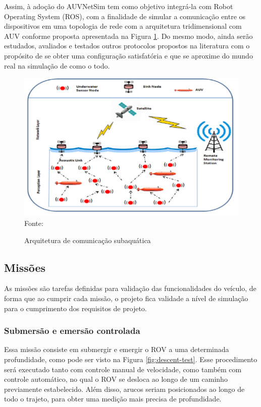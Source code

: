 Assim, à adoção do AUVNetSim tem como objetivo integrá-la com Robot Operating System (ROS), com a finalidade de simular a comunicação entre os dispositivos em uma topologia de rede com a arquitetura tridimensional com AUV conforme proposta apresentada na Figura \ref{fig:redes}. Do mesmo modo, ainda serão estudados, avaliados e testados outros protocolos propostos na literatura com o propósito de se obter uma configuração satisfatória e que se aproxime do mundo real na simulação de como o todo.

\begin{figure}
	\centering
	\caption{Arquitetura de comunicação subaquática}
	\label{fig:redes}
	\includegraphics[width=0.7\linewidth]{images/redes}\\
	\footnotesize Fonte: \cite{godi2021survey}
\end{figure}



\subsection{Missões}

As missões são tarefas definidas para validação das funcionalidades do veículo, de forma que ao cumprir cada missão, o projeto fica validade a nível de simulação para o cumprimento dos requisitos de projeto.

\subsubsection*{Submersão e emersão controlada}
Essa missão consiste em submergir e emergir o ROV a uma determinada profundidade,
como pode ser visto na Figura \ref{fig:descent-test}. Esse procedimento será executado tanto com controle manual de velocidade, como também com controle automático, no qual o ROV se desloca ao longo de um caminho previamente estabelecido. Além disso, arucos seriam posicionados ao longo de todo o trajeto, para obter uma medição mais precisa de profundidade.

